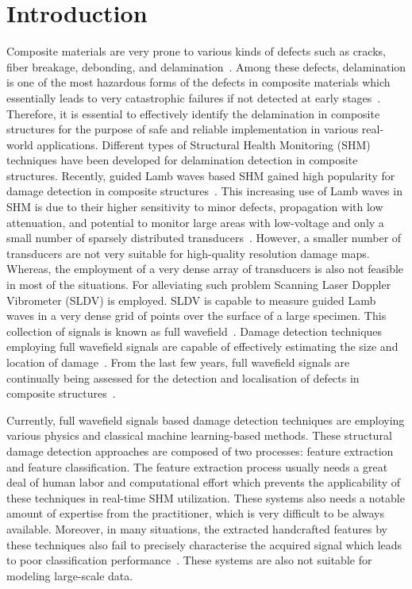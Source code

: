 \section{Introduction}
Composite materials are very prone to various kinds of defects such as cracks, fiber breakage, debonding, and delamination~\cite{ip2004delamination, smith2009composite}. Among these defects, delamination is one of the most hazardous forms of the defects in composite materials which essentially leads to very catastrophic failures if not detected at early stages~\cite{valdes1999delamination}. Therefore, it is essential to effectively identify the delamination in composite structures for the purpose of safe and reliable implementation in various real-world applications. Different types of Structural Health Monitoring (SHM) techniques have been developed for delamination detection in composite structures. Recently, guided Lamb waves based SHM gained high popularity for damage detection in composite structures~\cite{mitra2016guided}. This increasing use of Lamb waves in SHM is due to their higher sensitivity to minor defects, propagation with low attenuation, and potential to monitor large areas with low-voltage and only a small number of sparsely distributed transducers~\cite{alleyne1992interaction, giurgiutiu2003lamb, ihn2008pitch, mitra2016guided}. However, a smaller number of transducers are not very suitable for high-quality resolution damage maps. Whereas, the employment of a very dense array of transducers is also not feasible in most of the situations. For alleviating such problem Scanning Laser Doppler Vibrometer (SLDV) is employed. SLDV is capable to measure guided Lamb waves in a very dense grid of points over the surface of a large specimen. This collection of signals is known as full wavefield~\cite{radzienski2019damage}. Damage detection techniques employing full wavefield signals are capable of effectively estimating the size and location of damage~\cite{girolamo2018impact, kudela2018impact}. From the last few years, full wavefield signals are continually being assessed for the detection and localisation of defects in composite structures~\cite{sohn2011delamination, sohn2011automated, rogge2013characterization, kudela2018impact, radzienski2019damage}.

Currently, full wavefield signals based damage detection techniques are employing various physics and classical machine learning-based methods. These structural damage detection approaches are composed of two processes: feature extraction and feature classification. The feature extraction process usually needs a great deal of human labor and computational effort which prevents the applicability of these techniques in real-time SHM utilization. These systems also needs a notable amount of expertise from the practitioner, which is very difficult to be always available. Moreover, in many situations, the extracted handcrafted features by these techniques also fail to precisely characterise the acquired signal which leads to poor classification performance~\cite{zhao2019deep, yuan2020machine}. These systems are also not suitable for modeling large-scale data.


